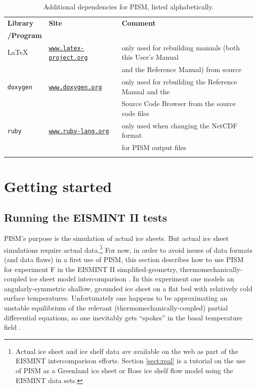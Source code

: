 \documentclass[11pt,final]{amsart}
\renewcommand{\t}[1]{\texttt{#1}}
\begin{document}
\begin{table}[h]
\caption{Additional dependencies for PISM, listed alphabetically.  }\label{tab:PISMdepends_superdev}
\small
\begin{tabular}{@{}llll}\hline
\textbf{Library} & \textbf{Site} & \textbf{Comment} \\
\textbf{/Program} &  &  &  \\ \hline
\LaTeX & \href{http://www.latex-project.org/}{\t{www.latex-project.org}} & only used for rebuilding manuals (both this User's Manual  \\
 &  & and the Reference Manual) from source \\
\texttt{doxygen} & \href{http://www.stack.nl/~dimitri/doxygen/}{\t{www.doxygen.org}} & only used for rebuilding the Reference Manual and the \\
 & & Source Code Browser from the source code files \\
\texttt{ruby} & \href{http://www.ruby-lang.org/en/}{\texttt{www.ruby-lang.org}} & only used when changing the NetCDF format \\
 &  & for PISM output files \\
\hline
\normalsize
\end{tabular}
\end{table}


\clearpage\newpage
\section{Getting started}\label{sect:start}

\subsection{Running the EISMINT II tests}  PISM's purpose is the simulation of actual ice sheets.  But actual ice sheet simulations require actual data.\footnote{Actual ice sheet and ice shelf data \emph{are} available on the web as part of the EISMINT intercomparison efforts.  Section \ref{sect:real} is a tutorial on the use of PISM as a Greenland ice sheet or Ross ice shelf flow model using the EISMINT data sets.}  For now, in order to avoid issues of data formats (and data flaws) in a first use of PISM, this section describes how to use PISM for experiment F in the EISMINT II simplified-geometry, thermomechanically-coupled ice sheet model intercomparison \cite{EISMINT00}.  In this experiment one models an angularly-symmetric shallow, grounded ice sheet on a flat bed with relatively cold surface temperatures.  Unfortunately one happens to be approximating an unstable equilibrium of the relevant (thermomechanically-coupled) partial differential equations, so one inevitably gets ``spokes'' in the basal temperature field \cite{BBL,PayneBaldwin,SaitoEISMINT}.
\end{document}
